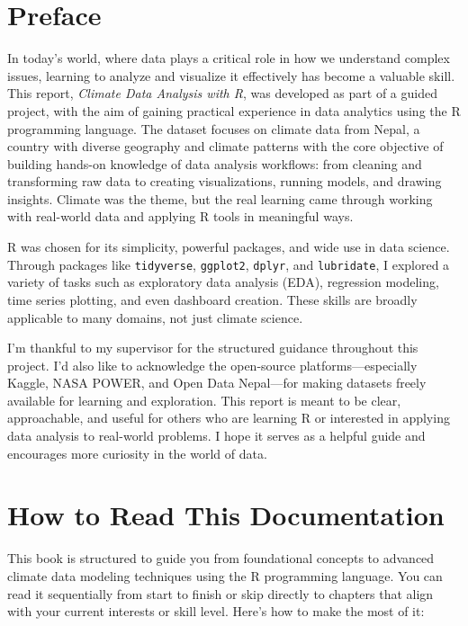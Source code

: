 \section*{Preface}

In today’s world, where data plays a critical role in how we understand complex issues, learning to analyze and visualize it effectively has become a valuable skill. This report, \textit{Climate Data Analysis with R}, was developed as part of a guided project, with the aim of gaining practical experience in data analytics using the R programming language. The dataset focuses on climate data from Nepal, a country with diverse geography and climate patterns with the core objective of building hands-on knowledge of data analysis workflows: from cleaning and transforming raw data to creating visualizations, running models, and drawing insights. Climate was the theme, but the real learning came through working with real-world data and applying R tools in meaningful ways.

R was chosen for its simplicity, powerful packages, and wide use in data science. Through packages like \texttt{tidyverse}, \texttt{ggplot2}, \texttt{dplyr}, and \texttt{lubridate}, I explored a variety of tasks such as exploratory data analysis (EDA), regression modeling, time series plotting, and even dashboard creation. These skills are broadly applicable to many domains, not just climate science.

I’m thankful to my supervisor for the structured guidance throughout this project. I’d also like to acknowledge the open-source platforms—especially Kaggle, NASA POWER, and Open Data Nepal—for making datasets freely available for learning and exploration. This report is meant to be clear, approachable, and useful for others who are learning R or interested in applying data analysis to real-world problems. I hope it serves as a helpful guide and encourages more curiosity in the world of data.
\section*{How to Read This Documentation}

This book is structured to guide you from foundational concepts to advanced climate data modeling techniques using the R programming language. You can read it sequentially from start to finish or skip directly to chapters that align with your current interests or skill level. Here’s how to make the most of it:

